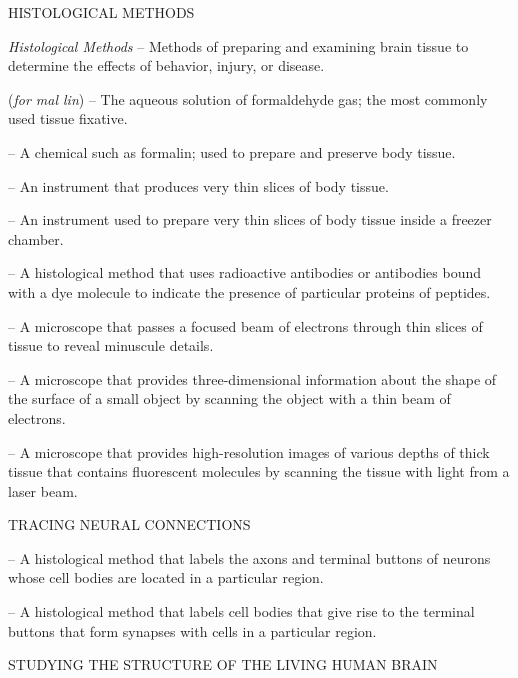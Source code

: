 \textsc{HISTOLOGICAL METHODS}
\begin{coloredlist}
    \item \textit{Histological Methods} -- Methods of preparing and examining brain tissue to determine the effects of behavior, injury, or disease.
    \item {} (\textit{for mal lin}) -- The aqueous solution of formaldehyde gas; the most commonly used tissue fixative. 
    \item {} -- A chemical such as formalin; used to prepare and preserve body tissue.
    \item {} -- An instrument that produces very thin slices of body tissue.
    \item {} -- An instrument used to prepare very thin slices of body tissue inside a freezer chamber.
    \item {} -- A histological method that uses radioactive antibodies or antibodies bound with a dye molecule to indicate the presence of particular proteins of peptides.
    \item {} -- A microscope that passes a focused beam of electrons through thin slices of tissue to reveal minuscule details.
    \item {} -- A microscope that provides three-dimensional information about the shape of the surface of a small object by scanning the object with a thin beam of electrons.
    \item {} -- A microscope that provides high-resolution images of various depths of thick tissue that contains fluorescent molecules by scanning the tissue with light from a laser beam.
\end{coloredlist}
\textsc{TRACING NEURAL CONNECTIONS} 
\begin{coloredlist}
    \item {} -- A histological method that labels the axons and terminal buttons of neurons whose cell bodies are located in a particular region.
    \item {} -- A histological method that labels cell bodies that give rise to the terminal buttons that form synapses with cells in a particular region.
\end{coloredlist}
\textsc{STUDYING THE STRUCTURE OF THE LIVING HUMAN BRAIN}
